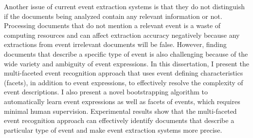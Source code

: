 Another issue of current event extraction systems is 
that they do not distinguish if the documents being 
analyzed contain any relevant information or not. 
Processing documents that do not mention a relevant event 
is 
a waste of computing resources and 
can affect extraction accuracy negatively 
because any extractions from event irrelevant documents
will be false. 
However, finding documents that describe a specific type of event 
is also challenging because of the wide variety and 
ambiguity of event expressions. 
In this dissertation, I present 
the multi-faceted event recognition approach that uses 
event defining characteristics (facets), 
in addition to event expressions, to effectively 
resolve the complexity of event descriptions. I also 
present a novel bootstrapping algorithm to automatically 
learn event expressions as well as facets of events, 
which requires minimal human supervision. 
Experimental results show that the multi-faceted event recognition approach 
can effectively identify documents that describe a particular type of event and 
make event extraction systems more precise. 
